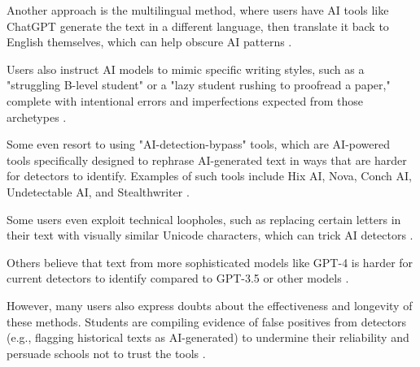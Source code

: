 \documentclass{article}
\begin{document}
Another approach is the multilingual method, where users have AI tools like ChatGPT generate the text in a different language,
then translate it back to English themselves, which can help obscure AI patterns
\cite{reddit_bypass_ai_detection_1}.

Users also instruct AI models to mimic specific writing styles, such as a "struggling B-level student"
or a "lazy student rushing to proofread a paper," complete with intentional errors and imperfections
expected from those archetypes \cite{reddit_bypass_ai_detection_2}
\cite{reddit_fool_ai_detector}.

Some even resort to using "AI-detection-bypass" tools, which are AI-powered tools specifically designed
to rephrase AI-generated text in ways that are harder for detectors to identify. Examples of such tools
include Hix AI, Nova, Conch AI, Undetectable AI, and Stealthwriter
\cite{reddit_avoid_ai_detection}
\cite{reddit_bypass_ai_detection_2}
\cite{reddit_bypass_ai_detection_3}.

Some users even exploit technical loopholes, such as replacing certain letters in their text with visually
similar Unicode characters, which can trick AI detectors
\cite{reddit_bypass_ai_detection_4}.

Others believe that text from more sophisticated models like GPT-4 is harder for current detectors
to identify compared to GPT-3.5 or other models \cite{reddit_bypass_ai_detection_1}.

However, many users also express doubts about the effectiveness and longevity of these methods.
Students are compiling evidence of false positives from detectors (e.g., flagging historical texts as AI-generated)
to undermine their reliability and persuade schools not to trust the tools \cite{reddit_fool_ai_detector}
\cite{reddit_bypass_ai_detection_4}.
\end{document}
